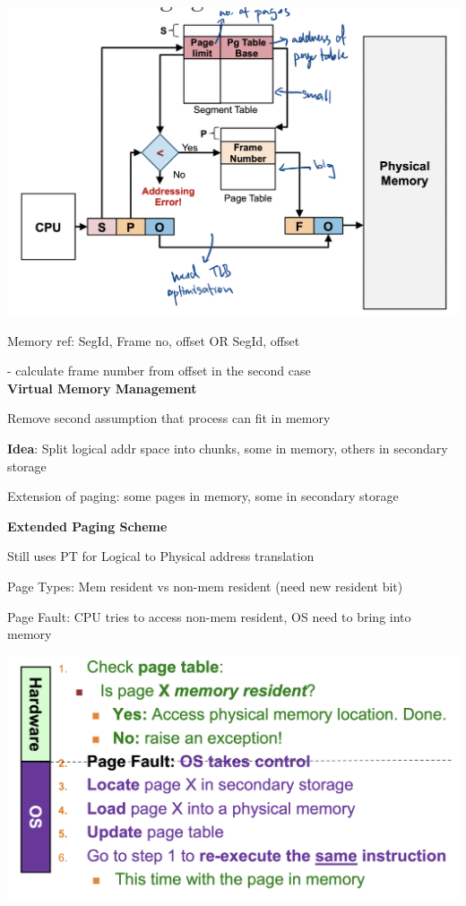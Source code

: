 \documentclass[10pt, a4paper]{article}
\newcommand{\red}[1]{{\color{red}#1}}
\newcommand{\green}[1]{{\color{ForestGreen}#1}}
\newcommand{\header}[1]{{\normalsize\textbf{#1}}}
\newcommand{\tab}[0]{\hspace*{2mm}}
\begin{document}
\begin{multicols*}{3}
		\includegraphics*[scale=0.27]{./assets/segmentationPaging}

		Memory ref: \red{SegId}, \green{Frame no}, offset OR \red{SegId}, \green{offset}

		\tab{} - calculate frame number from offset in the second case\\

		\header{Virtual Memory Management}

		Remove second assumption that process can fit in memory

		\textbf{Idea}: Split logical addr space into chunks, some in memory, others in \red{secondary storage}

		Extension of paging: some pages in memory, some in secondary storage

		\textbf{Extended Paging Scheme}

		Still uses PT for Logical to Physical address translation

		Page Types: Mem resident vs non-mem resident (need new \red{resident} bit)

		\red{Page Fault}: CPU tries to access non-mem resident, OS need to bring into memory

		\includegraphics*[scale=0.2]{./assets/virtualPaging}


\end{multicols*}
\end{document}
